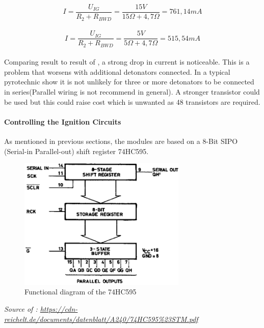 \begin{equation}
I=\frac{U_{IG}}{R_2+R_{BWD}}=\frac{15V}{15\Omega+4,7\Omega}= 761,14mA
\label{eq:current_15v}
\end{equation}\\
\begin{equation}
I=\frac{U_{IG}}{R_2+R_{BWD}}=\frac{5V}{5\Omega+4,7\Omega}= 515,54mA
\label{eq:current_5v}
\end{equation}\\

\noindent Comparing result  to result of , a strong drop in current is noticeable. This is a problem that worsens with additional detonators connected. In a typical pyrotechnic show it is not unlikely for three or more detonators to be connected in series(Parallel wiring is not recommend in general). A stronger transistor could be used but this could raise cost which is unwanted as 48 transistors are required.\\

\pagebreak

\paragraph{Controlling the Ignition Circuits}
As mentioned in previous sections, the modules are based on a 8-Bit SIPO (Serial-in Parallel-out) shift register 74HC595. 

\begin{figure}[!ht]
    \centering
    \includegraphics[width=8cm]{./Figures/75hc595.png}
    \caption{Functional diagram of the 74HC595}
    \label{fig:75hc595}     
\end{figure}

\noindent \textit{\small{Source of : \url{https://cdn-reichelt.de/documents/datenblatt/A240/74HC595\%23STM.pdf}}}\\

